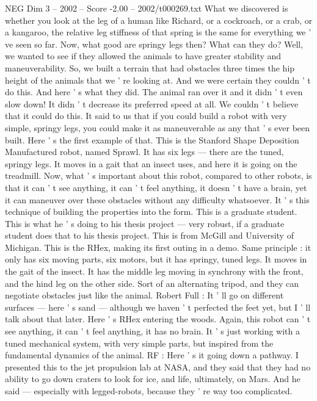 \begin{textsample}{NEG Dim 3 – 2002 – Score -2.00 – 2002/t000269.txt}
What we discovered is whether you look at the leg of a human like Richard, or a cockroach, or a crab, or a kangaroo, the relative leg stiffness of that spring is the same for everything we ' ve seen so far.
Now, what good are springy legs then?
What can they do?
Well, we wanted to see if they allowed the animals to have greater stability and maneuverability.
So, we built a terrain that had obstacles three times the hip height of the animals that we ' re looking at.
And we were certain they couldn ' t do this.
And here ' s what they did.
The animal ran over it and it didn ' t even slow down!
It didn ' t decrease its preferred speed at all.
We couldn ' t believe that it could do this.
It said to us that if you could build a robot with very simple, springy legs, you could make it as maneuverable as any that ' s ever been built.
Here ' s the first example of that.
This is the Stanford Shape Deposition Manufactured robot, named Sprawl.
It has six legs — there are the tuned, springy legs.
It moves in a gait that an insect uses, and here it is going on the treadmill.
Now, what ' s important about this robot, compared to other robots, is that it can ' t see anything, it can ' t feel anything, it doesn ' t have a brain, yet it can maneuver over these obstacles without any difficulty whatsoever.
It ' s this technique of building the properties into the form.
This is a graduate student.
This is what he ' s doing to his thesis project — very robust, if a graduate student does that to his thesis project.
This is from McGill and University of Michigan.
This is the RHex, making its first outing in a demo.
Same principle : it only has six moving parts, six motors, but it has springy, tuned legs.
It moves in the gait of the insect.
It has the middle leg moving in synchrony with the front, and the hind leg on the other side.
Sort of an alternating tripod, and they can negotiate obstacles just like the animal.
Robert Full : It ' ll go on different surfaces — here ' s sand — although we haven ' t perfected the feet yet, but I ' ll talk about that later.
Here ' s RHex entering the woods.
Again, this robot can ' t see anything, it can ' t feel anything, it has no brain.
It ' s just working with a tuned mechanical system, with very simple parts, but inspired from the fundamental dynamics of the animal.
RF : Here ' s it going down a pathway.
I presented this to the jet propulsion lab at NASA, and they said that they had no ability to go down craters to look for ice, and life, ultimately, on Mars.
And he said — especially with legged-robots, because they ' re way too complicated.

\end{textsample}
